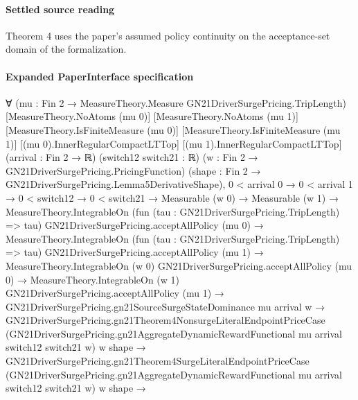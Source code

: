 \documentclass[10pt]{article}
\begin{document}
\paragraph{Settled source reading}
\begin{sloppypar}
Theorem 4 uses the paper's assumed policy continuity on the acceptance-\allowbreak{}set domain of the formalization.\allowbreak{}
\end{sloppypar}

\paragraph{Expanded PaperInterface specification}
\begin{ReviewVerbatim}
∀ (mu : Fin 2 → MeasureTheory.Measure GN21DriverSurgePricing.TripLength) [MeasureTheory.NoAtoms (mu 0)]
  [MeasureTheory.NoAtoms (mu 1)] [MeasureTheory.IsFiniteMeasure (mu 0)] [MeasureTheory.IsFiniteMeasure (mu 1)]
  [(mu 0).InnerRegularCompactLTTop] [(mu 1).InnerRegularCompactLTTop] (arrival : Fin 2 → ℝ) (switch12 switch21 : ℝ)
  (w : Fin 2 → GN21DriverSurgePricing.PricingFunction) (shape : Fin 2 → GN21DriverSurgePricing.Lemma5DerivativeShape),
  0 < arrival 0 →
    0 < arrival 1 →
      0 < switch12 →
        0 < switch21 →
          Measurable (w 0) →
            Measurable (w 1) →
              MeasureTheory.IntegrableOn (fun (tau : GN21DriverSurgePricing.TripLength) => tau)
                  GN21DriverSurgePricing.acceptAllPolicy (mu 0) →
                MeasureTheory.IntegrableOn (fun (tau : GN21DriverSurgePricing.TripLength) => tau)
                    GN21DriverSurgePricing.acceptAllPolicy (mu 1) →
                  MeasureTheory.IntegrableOn (w 0) GN21DriverSurgePricing.acceptAllPolicy (mu 0) →
                    MeasureTheory.IntegrableOn (w 1) GN21DriverSurgePricing.acceptAllPolicy (mu 1) →
                      GN21DriverSurgePricing.gn21SourceSurgeStateDominance mu arrival w →
                        GN21DriverSurgePricing.gn21Theorem4NonsurgeLiteralEndpointPriceCase
                            (GN21DriverSurgePricing.gn21AggregateDynamicRewardFunctional mu arrival switch12 switch21 w)
                            w shape →
                          GN21DriverSurgePricing.gn21Theorem4SurgeLiteralEndpointPriceCase
                              (GN21DriverSurgePricing.gn21AggregateDynamicRewardFunctional mu arrival switch12 switch21
                                w)
                              w shape →

\end{ReviewVerbatim}
\end{document}
